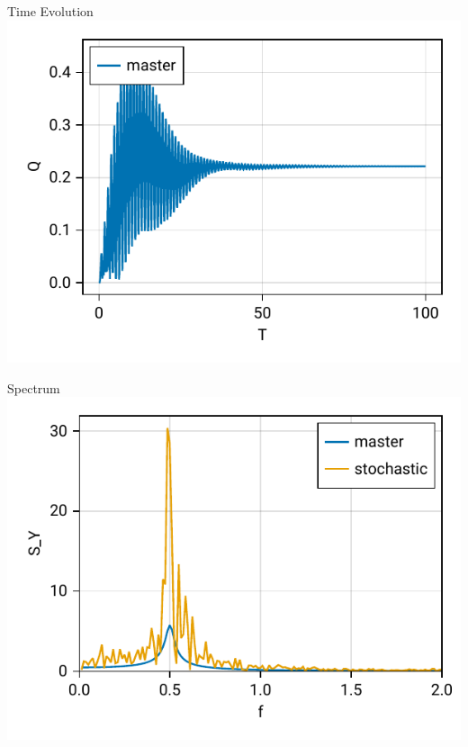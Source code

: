 \documentclass{beamer}
\begin{document}
\begin{frame}{Time Evolution}
	\centering
	\includegraphics{figures/01 time evolution.pdf}
\end{frame}

\begin{frame}{Spectrum}
	\centering
	\includegraphics{figures/01 time evolution spectrum.pdf}
\end{frame}
\end{document}

